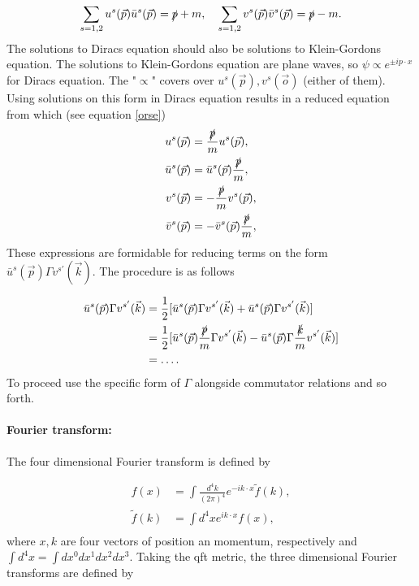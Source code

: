 \begin{equation}
	\sum_{s=1,2}u^s(\vec{p})\bar{u}^s(\vec{p})=\slashed p+m, \quad \sum_{s=1,2}v^s(\vec{p})\bar{v}^s(\vec{p})=\slashed p-m.
\end{equation} 
The solutions to Diracs equation should also be solutions to Klein-Gordons equation. The solutions to Klein-Gordons equation are plane waves, so $\psi\propto e^{\pm ip\cdot x}$ for Diracs equation. The "$\propto$" covers over $u^s(\vec{p}), v^s(\vec{o})$ (either of them). Using solutions on this form in Diracs equation results in a reduced equation from which (see equation \eqref{orse})
\begin{equation}
	\begin{split}
		u^s(\vec{p})&=\frac{\slashed p}{m}u^s(\vec{p}),\\
		\bar{u}^s(\vec{p})&=\bar{u}^s(\vec{p})\frac{\slashed p}{m},\\
		v^s(\vec{p})&=-\frac{\slashed p}{m}v^s(\vec{p}),\\
		\bar{v}^s(\vec{p})&=-\bar{v}^s(\vec{p})\frac{\slashed p}{m},\\
	\end{split}
\end{equation} 
These expressions are formidable for reducing terms on the form $\bar{u}^s(\vec{p})\Gamma v^{s'}(\vec{k})$. The procedure is as follows

\begin{equation}
	\begin{split}
		\bar{u}^s(\vec{p})\Gamma v^{s'}(\vec{k})&=\frac{1}{2}[\bar{u}^s(\vec{p})\Gamma v^{s'}(\vec{k})+\bar{u}^s(\vec{p})\Gamma v^{s'}(\vec{k})]\\
		&=\frac{1}{2}[\bar{u}^s(\vec{p})\frac{\slashed p}{m}\Gamma v^{s'}(\vec{k})-\bar{u}^s(\vec{p})\Gamma \frac{\slashed k}{m} v^{s'}(\vec{k})]\\
		&=\dots.
	\end{split}
\end{equation} 
To proceed use the specific form of $\Gamma$ alongside commutator relations and so forth.

\paragraph{Fourier transform:}
The four dimensional Fourier transform is defined by

\begin{equation}
	\begin{split}
		f(x)&=\int \frac{d^4k}{(2\pi)^4}e^{-ik\cdot x}\tilde{f}(k),\\
		\tilde{f}(k)&=\int d^4x e^{ik\cdot x}f(x),\\
	\end{split}
\end{equation} 
where $x,k$ are four vectors of position an momentum, respectively and $\int d^4x=\int dx^0dx^1dx^2dx^3$. Taking the qft metric, the three dimensional Fourier transforms are defined by

